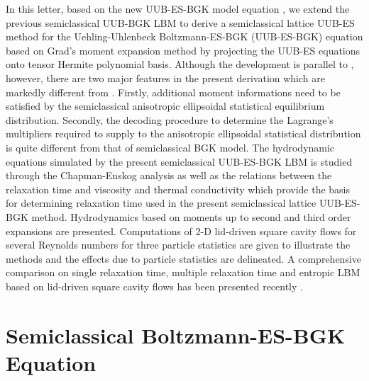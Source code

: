 \documentclass[doublecol]{epl2}
\begin{document}
In this letter, based on the new UUB-ES-BGK model equation \cite{Wu2012}, we extend the previous semiclassical UUB-BGK LBM  \cite{Yang2009} to
derive a semiclassical lattice UUB-ES method for the Uehling-Uhlenbeck Boltzmann-ES-BGK (UUB-ES-BGK) equation based on Grad's moment expansion method by projecting the UUB-ES equations onto tensor Hermite polynomial basis.  Although the development is parallel to \cite{Yang2009}, however, there are two major features in the present derivation which are markedly different from \cite{Yang2009}. Firstly, additional moment informations need to be satisfied by the  semiclassical anisotropic ellipsoidal statistical equilibrium distribution. Secondly, the decoding procedure to determine the Lagrange's multipliers required to supply to the anisotropic ellipsoidal statistical distribution is quite different from that of semiclassical BGK model.  The hydrodynamic equations simulated by the present semiclassical UUB-ES-BGK LBM is studied through the Chapman-Enskog analysis as well as the relations between the relaxation time and viscosity and thermal conductivity which provide the basis for determining relaxation time used in the present semiclassical lattice UUB-ES-BGK method.  Hydrodynamics based on moments up to second and third order expansions are presented. Computations of 2-D lid-driven square cavity flows for several Reynolds numbers for three particle statistics are given to illustrate the methods and the effects due to particle statistics are delineated.  A comprehensive comparison on single relaxation time, multiple relaxation time and entropic LBM based on lid-driven square cavity flows has been presented recently \cite{Luo2012}.

\section{Semiclassical Boltzmann-ES-BGK Equation}
\end{document}
